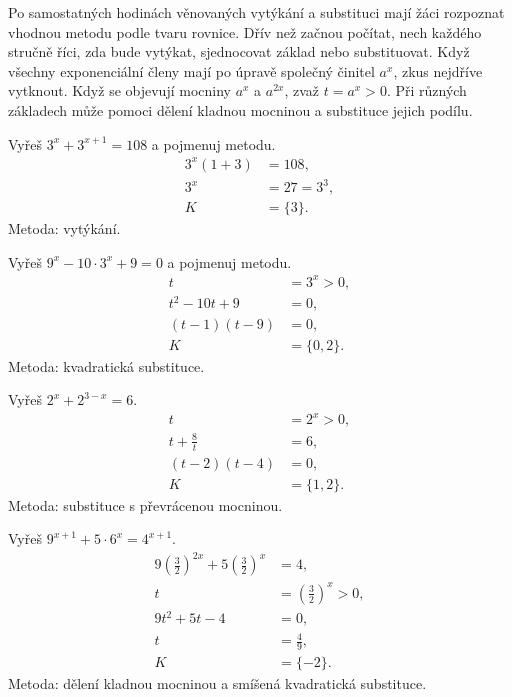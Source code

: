 \documentclass[11pt,a4paper]{article}
\begin{document}
Po samostatných hodinách věnovaných vytýkání a substituci mají žáci rozpoznat vhodnou metodu podle tvaru rovnice. Dřív než začnou počítat, nech každého stručně říci, zda bude vytýkat, sjednocovat základ nebo substituovat.
Když všechny exponenciální členy mají po úpravě společný činitel $a^x$, zkus nejdříve vytknout. Když se objevují mocniny $a^x$ a $a^{2x}$, zvaž $t=a^x>0$. Při různých základech může pomoci dělení kladnou mocninou a substituce jejich podílu.
\begin{prikladReseniBox}[title={Příklad 1}]
Vyřeš $3^x+3^{x+1}=108$ a pojmenuj metodu.
\tcblower
\[
\begin{aligned}3^x(1+3)&=108,\\3^x&=27=3^3,\\K&=\{3\}.\end{aligned}
\]
Metoda: vytýkání.
\end{prikladReseniBox}
\begin{prikladReseniBox}[title={Příklad 2}]
Vyřeš $9^x-10\cdot3^x+9=0$ a pojmenuj metodu.
\tcblower
\[
\begin{aligned}t&=3^x>0,\\t^2-10t+9&=0,\\(t-1)(t-9)&=0,\\K&=\{0,2\}.\end{aligned}
\]
Metoda: kvadratická substituce.
\end{prikladReseniBox}
\begin{prikladReseniBox}[title={Příklad 3}]
Vyřeš $2^x+2^{3-x}=6$.
\tcblower
\[
\begin{aligned}t&=2^x>0,\\t+\frac{8}{t}&=6,\\(t-2)(t-4)&=0,\\K&=\{1,2\}.\end{aligned}
\]
Metoda: substituce s převrácenou mocninou.
\end{prikladReseniBox}
\begin{prikladReseniBox}[title={Příklad 4}]
Vyřeš $9^{x+1}+5\cdot6^x=4^{x+1}$.
\tcblower
\[
\begin{aligned}9\left(\frac{3}{2}\right)^{2x}+5\left(\frac{3}{2}\right)^x&=4,\\t&=\left(\frac{3}{2}\right)^x>0,\\9t^2+5t-4&=0,\\t&=\frac{4}{9},\\K&=\{-2\}.\end{aligned}
\]
Metoda: dělení kladnou mocninou a smíšená kvadratická substituce.
\end{prikladReseniBox}
\end{document}
